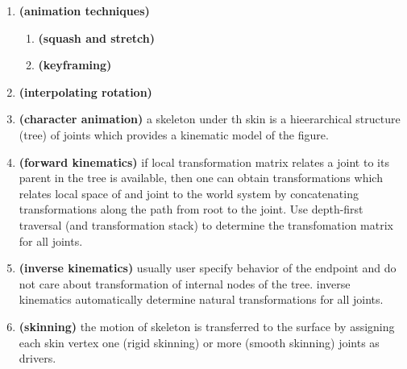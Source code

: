 \documentclass[11pt]{article}
\newcommand{\bheading}[1]{\textbf{(#1)}}
\begin{document}
\begin{enumerate}
    \item \bheading{animation techniques}
    \begin{enumerate}
        \item \bheading{squash and stretch}
        \item \bheading{keyframing} 
    \end{enumerate}
    \item \bheading{interpolating rotation} 
    \item \bheading{character animation} a skeleton under th skin is a hieerarchical structure (tree) of joints which provides a kinematic model of the figure.
    \item \bheading{forward kinematics} if local transformation matrix relates a joint to its parent in the tree is available, then one can obtain transformations which relates local space of and joint to the world system by concatenating transformations along the path from root to the joint. Use depth-first traversal (and transformation stack) to determine the transfomation matrix for all joints. 
    \item \bheading{inverse kinematics} usually user specify behavior of the endpoint and do not care about transformation of internal nodes of the tree. inverse kinematics automatically determine natural transformations for all joints.
    \item \bheading{skinning} the motion of skeleton is transferred to the surface by assigning each skin vertex one (rigid skinning) or more (smooth skinning) joints as drivers.
\end{enumerate}
 
\end{document}
